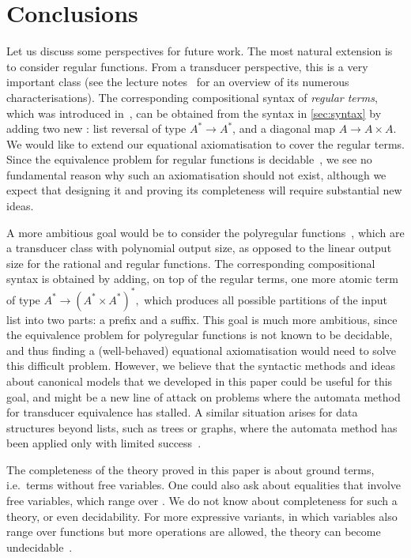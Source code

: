 \section{Conclusions}
\label{sec:conclusions}
Let us  discuss some perspectives for future work. The most natural extension is to consider regular functions. From a transducer perspective, this is a very important class (see the lecture notes~\cite[Part C]{Bojanczyk2026} for an overview of its numerous characterisations). The corresponding compositional syntax of \emph{regular terms}, which was introduced in~\cite{BojanczykDaviaudKrishna2018}, can be obtained from the syntax in \cref{sec:syntax} by adding two new : list reversal of type $A^* \to A^*$, and a diagonal map $A \to A \times A$.  We would like to extend our equational axiomatisation to cover the regular terms. Since the equivalence problem for regular functions is decidable~\cite[Theorem 1]{Gurari1982}, we see no fundamental reason why such an axiomatisation should not exist, although we expect that designing it and proving its completeness will require substantial new ideas.

A more ambitious goal would be to consider the polyregular functions~\cite{Bojanczyk2022}, which are a transducer class with polynomial output size, as opposed to the linear output size for the rational and regular functions. The corresponding compositional syntax is obtained by adding, on top of the regular terms, one more atomic term of type 
$
A^* \to (A^* \times A^*)^*,
$
which produces all possible partitions of the input list into two parts: a prefix and a suffix. This goal is much more ambitious, since the equivalence problem for polyregular functions is not known to be decidable, and thus finding a (well-behaved) equational axiomatisation would need to solve this difficult problem. However, we believe that the syntactic methods and ideas about canonical models that we developed in this paper could  be useful for this goal, and might be a new line of attack on problems where the automata method for transducer equivalence has stalled. A similar situation arises for data structures beyond lists, such as trees or graphs, where the automata method has been applied only with limited success~\cite{BojanczykSchmude2020}. 

The completeness of the theory proved in this paper is about ground terms, i.e.~terms without free variables. One could also ask about equalities that involve free variables, which range over . We do not know about completeness for such a theory, or even decidability. For more expressive variants, in which variables also range over functions but more operations are allowed, the theory can become undecidable~\cite[Theorem 3.1]{BojanczykFabinaskiStefanski2026}.

